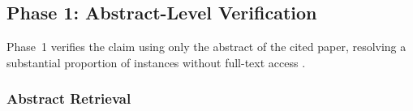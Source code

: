 \documentclass{article}
\theoremstyle{plain}
\theoremstyle{definition}
\theoremstyle{remark}
\begin{document}
\subsection{Phase 1: Abstract-Level Verification}
\label{sec:phase1}

Phase~1 verifies the claim using only the abstract of the cited paper, resolving a substantial proportion of instances without full-text access \cite{wadden2020fact, wadden2021sciver}.






\subsubsection{Abstract Retrieval}
\label{sec:abstract_retrieval}
\end{document}
